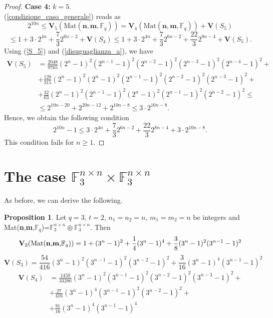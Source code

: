 \documentclass[11pt]{amsart}
\theoremstyle{definition}
\newtheorem{proposition}[theorem]{Proposition}
\begin{document}
\begin{proof}
\textbf{Case 4:} $k=5$.\\
(\ref{condizione_caso_generale}) reads as
\[
2^{10n}\leq\mathbf{V}_5(\text{Mat}(\textbf{n},\textbf{m},\mathbb{F}_q))=\mathbf{V}_4(\text{Mat}(\textbf{n},\textbf{m},\mathbb{F}_q))+\mathbf{V}(S_5)\]\[\leq1+ 3\cdot2^{4n}+\frac{7}{3}2^{6n-2}+\mathbf{V}(S_4)\leq1+ 3\cdot2^{4n}+\frac{7}{3}2^{6n-2}+\frac{22}{3}2^{8n-4}+\mathbf{V}(S_5).
\]
Using (\ref{S_5}) and (\ref{disuguaglianza_a}), we have
\[
\begin{aligned}
\mathbf{V}(S_5)&=\frac{2048}{9765}(2^n-1)^2(2^{n-1}-1)^2(2^{n-2}-1)^2(2^{n-3}-1)^2(2^{n-4}-1)^2+\\&+\frac{128}{315}(2^n-1)^2(2^n-1)^2(2^{n-1}-1)^2(2^{n-2}-1)^2(2^{n-3}-1)^2+\\&+\frac{32}{63}(2^n-1)^2(2^{n-1}-1)^2(2^n-1)^2(2^{n-1}-1)^2(2^{n-2}-1)^2\leq\\&\leq2^{10n-20}+2^{20n-12}+2^{10n-8}\leq3\cdot2^{10n-8}.
\end{aligned}
\]
Hence, we obtain the following condition 
\[
2^{10n}-1\leq3\cdot2^{4n}+\frac{7}{3}2^{6n-2}+\frac{22}{3}2^{8n-4}+3\cdot2^{10n-8}.
\]
This condition fails for $n\geq1$.
\end{proof}

\section{The case \texorpdfstring{$\mathbb{F}_3^{n\times n}\times \mathbb{F}_3^{n\times n}$}{F3(n×n) × F3(n×n)}}\label{app:q=32blocks}

As before, we can derive the following.

\begin{proposition}
Let $q=3$, $t=2$, $n_1=n_2=n$, $m_1=m_2=n$ be integers and Mat(\textbf{n},\textbf{m},$\mathbb{F}_q$)=$\mathbb{F}_3^{n\times n}\oplus\mathbb{F}_3^{n\times n}$. Then
\begin{equation}\label{S_2_3}
\textbf{V}_2(\text{Mat(\textbf{n},\textbf{m},$\mathbb{F}_q$)})=1+(3^n-1)^2+\frac{1}{4}(3^n-1)^4+\frac{3}{8}(3^n-1)^2(3^{n-1}-1)^2
\end{equation}
\begin{equation}\label{S_3_3}
\textbf{V}(S_3)=\frac{54}{416}(3^n-1)^2(3^{n-1}-1)^2(3^{n-2}-1)^2+\frac{3}{16}(3^n-1)^4(3^{n-1}-1)^2
\end{equation}
\begin{equation}\label{S_4_3}
	\begin{aligned}
\textbf{V}(S_4)&=\frac{1458}{33280}(3^n-1)^2(3^{n-1}-1)^2(3^{n-2}-1)^2(3^{n-3}-1)^2+\\&+\frac{27}{416}(3^n-1)^4(3^{n-1}-1)^2(3^{n-2}-1)^2+\\&+\frac{81}{16}(3^n-1)^4(3^{n-1}-1)^4
\end{aligned}
\end{equation}
\end{proposition}
\end{document}
